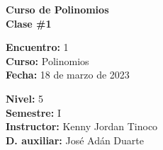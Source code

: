 \begin{center} \textbf
{
    \Large Curso de Polinomios \\ \vspace{2mm}Clase \#1
}
\end{center}

\begin{multicols}{2}
{
    \textbf{Encuentro:} 1\\
    \textbf{Curso:} Polinomios\\
    \textbf{Fecha:} 18 de marzo de 2023\\
    \begin{flushright}
        \textbf{Nivel:} 5\\
        \textbf{Semestre:} I\\
        \textbf{Instructor:} Kenny Jordan Tinoco\\
        \textbf{D. auxiliar: }José Adán Duarte
    \end{flushright}
}
\end{multicols}

\thispagestyle{first-page-style}